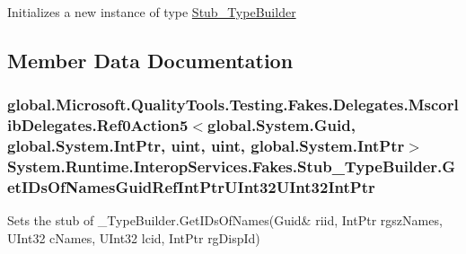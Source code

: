 Initializes a new instance of type \hyperlink{class_system_1_1_runtime_1_1_interop_services_1_1_fakes_1_1_stub___type_builder}{Stub\-\_\-\-Type\-Builder}



\subsection{Member Data Documentation}
\hypertarget{class_system_1_1_runtime_1_1_interop_services_1_1_fakes_1_1_stub___type_builder_a99e63eac3e31e5f4d4971b116f23d112}{
\subsubsection[{Get\-I\-Ds\-Of\-Names\-Guid\-Ref\-Int\-Ptr\-U\-Int32\-U\-Int32\-Int\-Ptr}]{\setlength{\rightskip}{0pt plus 5cm}global.\-Microsoft.\-Quality\-Tools.\-Testing.\-Fakes.\-Delegates.\-Mscorlib\-Delegates.\-Ref0\-Action5$<$global.\-System.\-Guid, global.\-System.\-Int\-Ptr, uint, uint, global.\-System.\-Int\-Ptr$>$ System.\-Runtime.\-Interop\-Services.\-Fakes.\-Stub\-\_\-\-Type\-Builder.\-Get\-I\-Ds\-Of\-Names\-Guid\-Ref\-Int\-Ptr\-U\-Int32\-U\-Int32\-Int\-Ptr}}\label{class_system_1_1_runtime_1_1_interop_services_1_1_fakes_1_1_stub___type_builder_a99e63eac3e31e5f4d4971b116f23d112}


Sets the stub of \-\_\-\-Type\-Builder.\-Get\-I\-Ds\-Of\-Names(Guid\& riid, Int\-Ptr rgsz\-Names, U\-Int32 c\-Names, U\-Int32 lcid, Int\-Ptr rg\-Disp\-Id)

